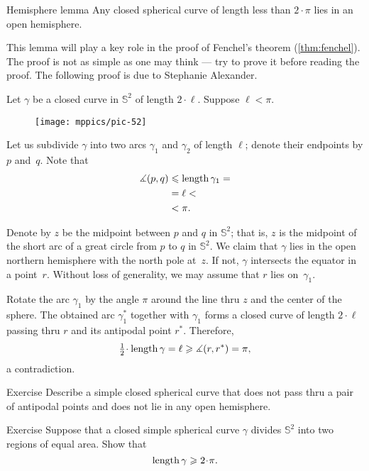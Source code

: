\begin{thm}{Hemisphere lemma}\label{lem:hemisphere}
Any closed spherical curve of length less than $2\cdot \pi$ lies in an open hemisphere. 
\end{thm}

This lemma will play a key role in the proof of Fenchel's theorem (\ref{thm:fenchel}).
The proof is not as simple as one may think --- try to prove it  before reading the proof.
The following proof is due to Stephanie Alexander.

Let $\gamma$ be a closed curve in $\mathbb{S}^2$ of length $2\cdot\ell$.
Suppose $\ell<\pi$.


\begin{wrapfigure}[8]{o}{35mm}
\vskip-0mm
\centering
\texttt{[image: mppics/pic-52]}
\end{wrapfigure}

Let us subdivide $\gamma$ into two arcs $\gamma_1$ and $\gamma_2$ of length $\ell$;
denote their endpoints by $p$ and~$q$. 
Note that 
\begin{align*}
\measuredangle(p,q)&\leqslant \mathop{\rm length}\nolimits \gamma_1=
\\
&= \ell<
\\
&<\pi.
\end{align*}

Denote by $z$ be the midpoint between $p$ and $q$ in $\mathbb{S}^2$;
that is, $z$ is the midpoint of the short arc of a great circle from $p$ to $q$ in $\mathbb{S}^2$. 
We claim that $\gamma$ lies in the open northern hemisphere with the north pole at~$z$.
If not, $\gamma$ intersects the equator in a point~$r$.
Without loss of generality, we may assume that $r$ lies on~$\gamma_1$. 

Rotate the arc $\gamma_1$ by the angle $\pi$ around the line thru $z$ and the center of the sphere.
The obtained arc $\gamma_1^{*}$ together with $\gamma_1$ forms a closed curve of length $2\cdot \ell$ passing thru $r$ and its antipodal point $r^{*}$.
Therefore,
\[\tfrac12\cdot\length \gamma=\ell\ge \measuredangle(r,r^{*})=\pi,\] 
a contradiction.
\qeds

\begin{thm}{Exercise}\label{ex:antipodal}
Describe a simple closed spherical curve that does not pass thru a pair of antipodal points and does not lie in any open  hemisphere.
\end{thm}


\begin{thm}{Exercise}\label{ex:bisection-of-S2}
Suppose that a closed simple spherical curve $\gamma$ divides $\mathbb{S}^2$ into two regions of equal area.
Show that 
\[\length\gamma\ge2\cdot\pi.\]
\end{thm}


